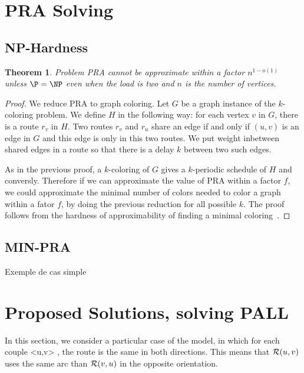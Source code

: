 \documentclass[a4paper,10pt]{article}
\newtheorem{theorem}{Theorem}
\begin{document}
	

  
\section{PRA Solving}
  
  \subsection{NP-Hardness}
	
   
    \begin{theorem}
    Problem PRA cannot be approximate within a factor $n^{1-o(1)}$ unless $\P = \NP$ even when the load is two
    and $n$ is the number of vertices.
    \end{theorem}

    \begin{proof}
    We reduce PRA to graph coloring. Let $G$ be a graph instance of the $k$-coloring problem. 
    We define $H$ in the following way: for each vertex $v$ in $G$, there is a route $r_v$ in $H$.
    Two routes $r_v$ and $r_u$ share an edge if and only if $(u,v)$ is an edge in $G$ and this edge is only in this two routes. 
    We put weight inbetween shared edges in a route so that there is a delay $k$ between two such edges. 
    
    As in the previous proof, a $k$-coloring of $G$ gives a $k$-periodic schedule of $H$
    and conversly. Therefore if we can approximate the value of PRA  within a factor $f$,
    we could approximate the minimal number of colors needed to color a graph within a fator $f$, 
    by doing the previous reduction for all possible $k$. The proof follows from the hardness of approximability
    of finding a minimal coloring~\cite{zuckerman2006linear}.
    \end{proof}


   
  \subsection{MIN-PRA}
    Exemple de cas simple
    
\section{Proposed Solutions, solving PALL}
  
  In this section, we consider a particular case of the model, in which for each couple <u,v> , the route is the same in both directions. This means that ${\cal R}(u,v)$ uses the same arc than ${\cal R}(v,u)$ in the opposite orientation.
\end{document}
